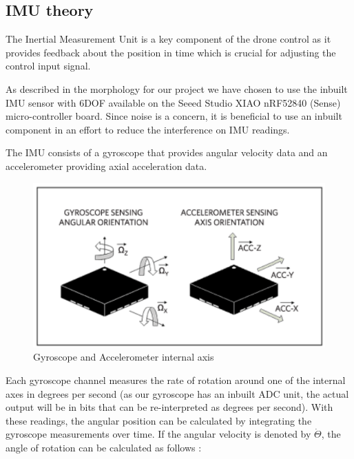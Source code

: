 \subsection{IMU theory}

The Inertial Measurement Unit is a key component of the drone control as it provides feedback about the position in time which is crucial for adjusting the control input signal.

As described in the morphology for our project we have chosen to use the inbuilt IMU sensor with 6DOF available on the Seeed Studio XIAO nRF52840 (Sense) micro-controller board. Since noise is a concern, it is beneficial to use an inbuilt component in an effort to reduce the interference on IMU readings.

The IMU consists of a gyroscope that provides angular velocity
data and an accelerometer providing axial acceleration data.

\begin{figure}[H]
    \begin{center}
    \includegraphics[scale = 0.5]{pictures/IMU/Gyro.png}
    \end{center}
    \caption{Gyroscope and Accelerometer internal axis }
    \label{fig:my_label}
\end{figure}


Each gyroscope channel measures the rate of rotation around one of the internal axes in degrees per second (as our gyroscope has an inbuilt ADC unit, the actual output will be in bits that can be re-interpreted as degrees per second). With these readings, the angular position can be calculated by integrating the gyroscope measurements over time. If the angular velocity is denoted by $\dot{\Theta}$, the angle of rotation can be calculated as follows :

